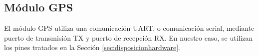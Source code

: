 

%
	
	
	
	




\subsection{Módulo GPS}
\label{subsec:configgps}

El módulo \acs{GPS} utiliza una comunicación \acs{UART}, o comunicación serial, mediante puerto de transmisión TX y puerto de recepción RX. En nuestro caso, se utilizan los pines tratados en la Sección \ref{sec:disposicionhardware}.



